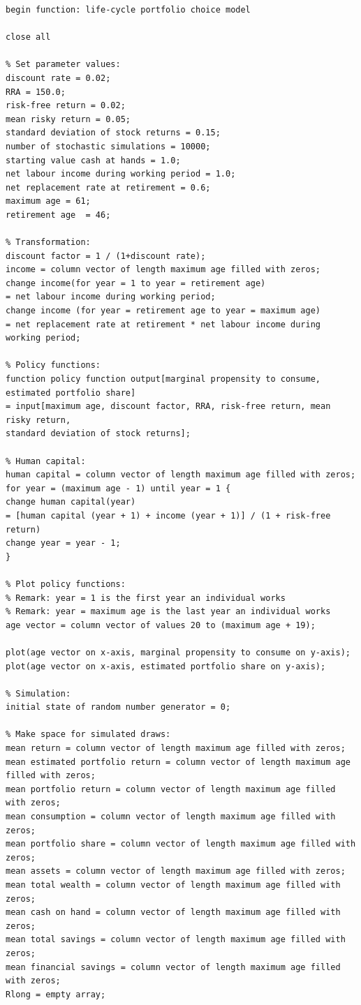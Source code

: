 \documentclass[12pt,a4paper]{article}
\begin{document}
\begin{lstlisting}[frame=single]
% Main function for the life-cycle portfolio choice model:
begin function: life-cycle portfolio choice model

close all

% Set parameter values:
discount rate = 0.02;
RRA = 150.0;
risk-free return = 0.02;
mean risky return = 0.05;
standard deviation of stock returns = 0.15;
number of stochastic simulations = 10000;
starting value cash at hands = 1.0;
net labour income during working period = 1.0;
net replacement rate at retirement = 0.6;
maximum age = 61;
retirement age  = 46;

% Transformation:
discount factor = 1 / (1+discount rate);
income = column vector of length maximum age filled with zeros;
change income(for year = 1 to year = retirement age)
= net labour income during working period;
change income (for year = retirement age to year = maximum age)
= net replacement rate at retirement * net labour income during working period;

% Policy functions:
function policy function output[marginal propensity to consume, estimated portfolio share]
= input[maximum age, discount factor, RRA, risk-free return, mean risky return,
standard deviation of stock returns];

% Human capital:
human capital = column vector of length maximum age filled with zeros;
for year = (maximum age - 1) until year = 1 {
change human capital(year)
= [human capital (year + 1) + income (year + 1)] / (1 + risk-free return)
change year = year - 1;
}

% Plot policy functions:
% Remark: year = 1 is the first year an individual works
% Remark: year = maximum age is the last year an individual works
age vector = column vector of values 20 to (maximum age + 19);

plot(age vector on x-axis, marginal propensity to consume on y-axis);
plot(age vector on x-axis, estimated portfolio share on y-axis);

% Simulation:
initial state of random number generator = 0;

% Make space for simulated draws:
mean return = column vector of length maximum age filled with zeros;
mean estimated portfolio return = column vector of length maximum age filled with zeros;
mean portfolio return = column vector of length maximum age filled with zeros;
mean consumption = column vector of length maximum age filled with zeros;
mean portfolio share = column vector of length maximum age filled with zeros;
mean assets = column vector of length maximum age filled with zeros;
mean total wealth = column vector of length maximum age filled with zeros;
mean cash on hand = column vector of length maximum age filled with zeros;
mean total savings = column vector of length maximum age filled with zeros;
mean financial savings = column vector of length maximum age filled with zeros;
Rlong = empty array;



\end{lstlisting}
\end{document}
